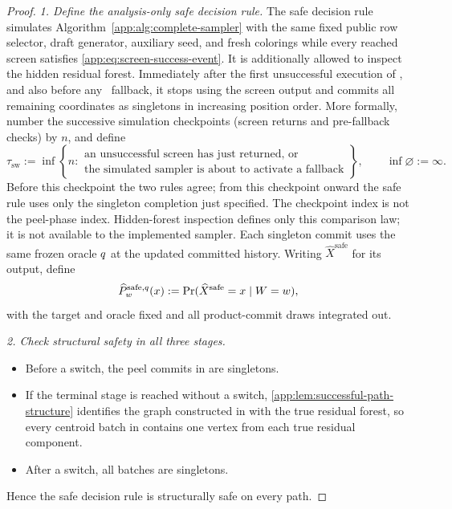 \begin{proof}

\emph{1. Define the analysis-only safe decision rule.}
The safe decision rule simulates Algorithm~\ref{app:alg:complete-sampler} with
the same fixed public row selector, draft generator, auxiliary seed, and fresh colorings while every
reached screen satisfies
\eqref{app:eq:screen-success-event}.  It is additionally allowed to inspect
the hidden residual forest.  Immediately after the first unsuccessful
execution of , and also before any \AlgoGuardRef\
fallback, it stops using the screen
output and commits all remaining coordinates as singletons in increasing
position order.  More formally, number the successive simulation checkpoints
(screen returns and pre-fallback checks) by $n$, and define
\[
 \tau_{\mathrm{sw}}
 :=\inf\left\{n:
 \begin{array}{l}
 \text{an unsuccessful screen has just returned, or}\\
 \text{the simulated sampler is about to activate a fallback}
 \end{array}\right\},
 \qquad \inf\varnothing:=\infty.
\]
Before this checkpoint the two rules agree; from this checkpoint onward
the safe rule uses only the singleton completion just specified.
The checkpoint index is not the peel-phase index.
Hidden-forest inspection defines only this comparison law; it is not
available to the implemented sampler.
Each singleton commit uses the same frozen oracle $q$ at the
updated committed history.  Writing $\widehat X^{\mathrm{safe}}$ for its
output, define
\[
 \widehat P_{w}^{\mathrm{safe},q}(x)
 :=\Pr(\widehat X^{\mathrm{safe}}=x\mid W=w),
\]
with the target and oracle fixed and all product-commit draws integrated out.


\emph{2. Check structural safety in all three stages.}
\begin{itemize}
\item Before a switch, the peel commits in  are singletons.
\item If the terminal stage is
reached without a switch, \cref{app:lem:successful-path-structure} identifies
the graph constructed in \AlgoBlockRef{terminal} with the true residual
forest, so every centroid batch in \AlgoBlockRef{centroid} contains one
vertex from each true residual component.
\item After a switch, all
batches are singletons.
\end{itemize}
Hence the safe decision rule is structurally safe on
every path.


\end{proof}
